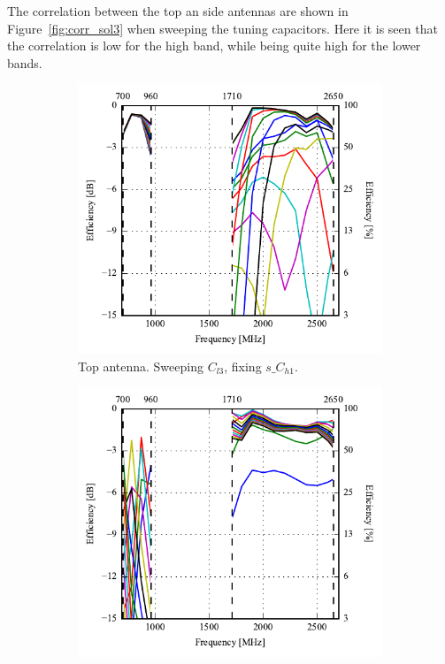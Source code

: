 The correlation between the top an side antennas are shown in Figure~\ref{fig:corr_sol3} when sweeping the tuning capacitors. Here it is seen that the correlation is low for the high band, while being quite high for the lower bands.  


\begin{figure}[htbp]
    \centering
    \begin{subfigure}{0.49\linewidth}
        \centering
        \includegraphics{img/tech_sol/nonresonant/simulation/freespace/Efficiency_AC2/efficiency-ac2-top.pdf}
        \caption{Top antenna. Sweeping $C_{l3}$, fixing $s\_C_{h1}$.}
    \end{subfigure}
    \hfill
    \begin{subfigure}{0.49\linewidth}
        \centering
        \includegraphics{img/tech_sol/nonresonant/simulation/freespace/Efficiency_AC3/efficiency-ac3-side.pdf}

\end{subfigure}
\end{figure}
